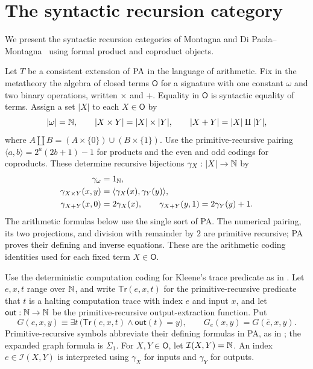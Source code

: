 \section{The syntactic recursion category}\label{sec:syntactic}

We present the syntactic recursion categories of Montagna and
Di Paola--Montagna~\cite{Montagna,DPM} using formal product and
coproduct objects.

Let $T$ be a consistent extension of $\mathrm{PA}$ in the language of arithmetic.
Fix in the metatheory the algebra of closed terms
$\mathsf O$ for a signature with one constant $\omega$ and two
binary operations, written $\times$ and $+$. Equality in $\mathsf O$
is syntactic equality of terms. Assign a set $|X|$ to each
$X\in\mathsf O$ by
\[
 |\omega|=\mathbb N,\qquad
 |X\times Y|=|X|\times|Y|,\qquad
 |X+Y|=|X|\amalg|Y|,
\]
where $A\amalg B=(A\times\{0\})\cup(B\times\{1\})$.
Use the primitive-recursive pairing
$\langle a,b\rangle=2^a(2b+1)-1$ for products and the even and
odd codings for coproducts. These determine recursive bijections
$\gamma_X:|X|\to\mathbb N$ by
\[
 \begin{aligned}
 \gamma_\omega&=1_\mathbb N,\\
 \gamma_{X\times Y}(x,y)
   &=\langle\gamma_X(x),\gamma_Y(y)\rangle,\\
 \gamma_{X+Y}(x,0)&=2\gamma_X(x),\qquad
 \gamma_{X+Y}(y,1)=2\gamma_Y(y)+1.
 \end{aligned}
\]
The arithmetic formulas below use the single sort of PA.
The numerical pairing, its two projections, and division with
remainder by $2$ are primitive recursive; PA proves their defining
and inverse equations. These are the arithmetic coding identities
used for each fixed term $X\in\mathsf O$.

Use the deterministic computation coding for Kleene's trace
predicate as in \cite[p.~115, Note~1]{Montagna}.
Let $e,x,t$ range over $\mathbb N$, and write
$\mathsf{Tr}(e,x,t)$ for the primitive-recursive predicate
that $t$ is a halting computation trace with index $e$ and input
$x$, and let $\mathsf{out}:\mathbb N\to\mathbb N$ be the primitive-recursive
output-extraction function. Put
\[
 G(e,x,y)\equiv
 \exists t\,\bigl(\mathsf{Tr}(e,x,t)\land\mathsf{out}(t)=y\bigr),
 \qquad G_e(x,y)=G(\bar e,x,y).
\]
Primitive-recursive symbols abbreviate their defining formulas in
PA, as in \cite[p.~644]{DPM}; the expanded graph formula is $\Sigma_1$.
For $X,Y\in\mathsf O$, let $\mathcal I(X,Y)=\mathbb N$.
An index $e\in\mathcal I(X,Y)$ is interpreted using
$\gamma_X$ for inputs and $\gamma_Y$ for outputs.

